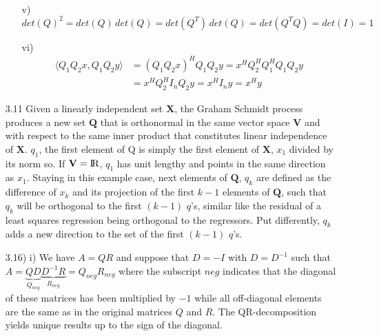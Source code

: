 \documentclass[letterpaper,12pt]{article}
\theoremstyle{definition}
\begin{document}
\begin{enumerate}
\begin{itemize}
\begin{align*}
\end{align*}
\item[v)] $det(Q)^2 = det(Q)\, det(Q) = det(Q^T)\, det(Q) = det(Q^TQ) = det(I)=1$
\item[vi)]
\begin{align*}
\langle Q_1Q_2x, Q_1Q_2y \rangle &= (Q_1Q_2x)^HQ_1Q_2y  = x^H Q_2^HQ_1^HQ_1Q_2y \\
&= x^HQ_2^HI_nQ_2y =x^HI_ny =x^Hy
\end{align*}
\end{itemize}
\item[3.11]
Given a linearly independent set $\mathbf{X}$, the Graham Schmidt process produces a new set $\mathbf{Q}$ that is orthonormal in the same vector space $\mathbf{V}$ and with respect to the same inner product that constitutes linear independence of $\mathbf{X}$. $q_1$, the first element of Q is simply the first element of $\mathbf{X}$, $x_1$ divided by its norm so. If $\mathbf{V}={\rm I\!R}$, $q_1$ has unit lengthy and points in the same direction as $x_1$. Staying in this example case, next elements of $\mathbf{Q}$, $q_k$ are defined as the difference of $x_k$ and its projection of the first $k-1$ elements of $\mathbf{Q}$, such that $q_k$ will be orthogonal to the first $(k-1)$ $q$'s, similar like the residual of a least squares regression being orthogonal to the regressors. Put differently, $q_k$ adds a new direction to the set of the first $(k-1)$ $q$'s.
\item[3.16)]
i) We have $A=QR$ and suppose that $D=-I$ with $D=D^{-1}$ such that $A=\underbrace{QD}_{Q_{neg}}\underbrace{D^{-1}R}_{R_{neg}} = Q_{neg}R_{neg}$ where  the subscript $neg$ indicates that the diagonal of these matrices has been multiplied by $-1$ while all off-diagonal elements are the same as in the original matrices $Q$ and  $R$. The QR-decomposition yields unique results up to the sign of the diagonal.


\end{enumerate}
\end{document}
